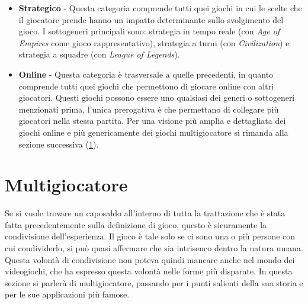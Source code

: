 \begin{itemize}
{                all'interno della stessa sessione un elevato numero di partecipanti, nell'ordine delle centinaia.} (con \textit{World of Warcraft}) e \textit{roguelike} (con \textit{The
                Binding of Isaac}).
            \item \textbf{Strategico} - Questa categoria comprende tutti quei giochi in cui le scelte che il giocatore prende hanno un impatto determinante sullo svolgimento del gioco.
                I sottogeneri principali sono: strategia in tempo reale (con \textit{Age of Empires} come gioco rappresentativo), strategia a turni (con \textit{Civilization}) e 
                strategia a squadre (con \textit{League of Legends}).
            \item \textbf{Online} - Questa categoria è trasversale a quelle precedenti, in quanto comprende tutti quei giochi che permettono di giocare online con altri giocatori. 
                Questi giochi possono essere uno qualsiasi dei generi o sottogeneri menzionati prima, l'unica prerogativa è che permettano di collegare più giocatori nella stessa partita.
                Per una visione più amplia e dettagliata dei giochi online e più genericamente dei giochi multigiocatore si rimanda alla sezione successiva (\ref{sec:Multigiocatore}).
        \end{itemize}

\section{Multigiocatore}\label{sec:Multigiocatore}
    Se si vuole trovare un caposaldo all'interno di tutta la trattazione che è stata fatta precedentemente sulla definizione di gioco, questo è sicuramente la condivisione dell'esperienza. 
    Il gioco è tale solo se ci sono una o più persone con cui condividerlo, si può quasi affermare che sia intrisenco dentro la natura umana. Questa volontà di condivisione 
    non poteva quindi mancare anche nel mondo dei videogiochi, che ha espresso questa volontà nelle forme più disparate. In questa sezione si parlerà di multigiocatore, passando per 
    i punti salienti della sua storia e per le sue applicazioni più famose.
